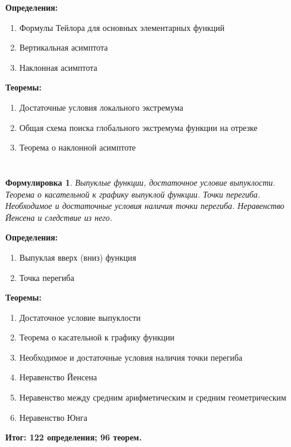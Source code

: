\documentclass[a4paper]{article}
\theoremstyle{plain}
\newtheorem*{st}{Формулировка}
\theoremstyle{definition}
\theoremstyle{remark}
\begin{document}
\textbf{Определения:}
\begin{enumerate}
    \item Формулы Тейлора для основных элементарных функций
    \item Вертикальная асимптота
    \item Наклонная асимптота
\end{enumerate}

\textbf{Теоремы:}
\begin{enumerate}
    \item Достаточные условия локального экстремума
    \item Общая схема поиска глобального экстремума функции на отрезке
    \item Теорема о наклонной асимптоте
\end{enumerate}


\section{}
\begin{st}
    Выпуклые функции, достаточное условие выпуклости. Теорема о касательной к графику выпуклой функции. Точки перегиба. Необходимое и достаточные условия наличия точки перегиба. Неравенство Йенсена и следствие из него.
\end{st}

\textbf{Определения:}
\begin{enumerate}
    \item Выпуклая вверх (вниз) функция
    \item Точка перегиба
\end{enumerate}

\textbf{Теоремы:}
\begin{enumerate}
    \item Достаточное условие выпуклости
    \item Теорема о касательной к графику функции
    \item Необходимое и достаточные условия наличия точки перегиба
    \item Неравенство Йенсена
    \item Неравенство между средним арифметическим и средним геометрическим
    \item Неравенство Юнга
\end{enumerate}


\textbf{Итог: 122 определения; 96 теорем.}




\titleformat{\section}{\LARGE \bfseries}{}{1em}{}
\titleformat{\subsection}{\Large\bfseries}{}{1em}{}
\end{document}
